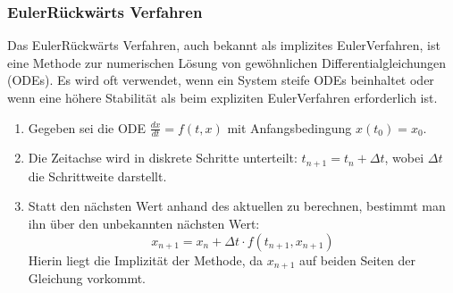 \documentclass[letterpaper,10pt,german]{jupyterBook}
\begin{document}
\subsubsection{Euler\sphinxhyphen{}Rückwärts Verfahren}
\label{\detokenize{chapters/chapter6/TransienteDynamik:euler-ruckwarts-verfahren}}
\sphinxAtStartPar
Das Euler\sphinxhyphen{}Rückwärts Verfahren, auch bekannt als implizites Euler\sphinxhyphen{}Verfahren, ist eine Methode zur numerischen Lösung von gewöhnlichen Differentialgleichungen (ODEs). Es wird oft verwendet, wenn ein System steife ODEs beinhaltet oder wenn eine höhere Stabilität als beim expliziten Euler\sphinxhyphen{}Verfahren erforderlich ist.
\begin{enumerate}
%
\item {} 
\sphinxAtStartPar
{}
Gegeben sei die ODE \( \frac{dx}{dt} = f(t, x) \) mit Anfangsbedingung \( x(t_0) = x_0 \).

\item {} 
\sphinxAtStartPar
{}
Die Zeitachse wird in diskrete Schritte unterteilt: \( t_{n+1} = t_n + \Delta t \), wobei \( \Delta t \) die Schrittweite darstellt.

\item {} 
\sphinxAtStartPar
{}
Statt den nächsten Wert anhand des aktuellen zu berechnen, bestimmt man ihn über den unbekannten nächsten Wert:
\begin{equation*}
x_{n+1} = x_n + \Delta t \cdot f(t_{n+1}, x_{n+1})
\end{equation*}
\sphinxAtStartPar
Hierin liegt die Implizität der Methode, da \( x_{n+1} \) auf beiden Seiten der Gleichung vorkommt.


\end{enumerate}
\end{document}
